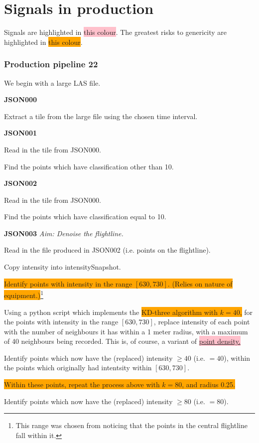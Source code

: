 \documentclass[a4paper,11pt,twoside]{article}
\theoremstyle{definition}
\theoremstyle{remark}
\newcommand{\sh}[1]{\colorbox{pink}{#1}}
\newcommand{\bad}[1]{\colorbox{orange}{#1}}
\begin{document}
\section{Signals in production}
Signals are highlighted in \sh{this colour}. The greatest risks to genericity are highlighted in \bad{this colour}.
\subsubsection{Production pipeline 22}
We begin with a large LAS file.
\begin{list}{}{}
\item \textbf{JSON000}
\item Extract a tile from the large file using the chosen time interval.
\item \textbf{JSON001}
\item Read in the tile from JSON000.
\item Find the points which have classification other than 10.
\item \textbf{JSON002}
\item Read in the tile from JSON000.
\item Find the points which have classification equal to 10.
\item \textbf{JSON003}
\emph{Aim: Denoise the flightline.}
\item Read in the file produced in JSON002 (i.e. points on the flightline).
\item Copy intensity into intensitySnapshot.
\item \bad{Identify points with intensity in the range $[630,730]$. (Relies on nature of equipment.)}\footnote{This range was chosen from noticing that the points in the central flightline fall within it.}
\item Using a python script which implements the \bad{KD-three algorithm with $k=40$,} for the points with intensity in the range $[630,730]$, replace intensity of each point with the number of neighbours it has within a 1 meter radius, with a maximum of 40 neighbours being recorded. This is, of course, a variant of \hyperref[crapptdens]{\sh{point density.}}
\item Identify points which now have the (replaced) intensity $\geqslant 40$ (i.e. $=40$), within the points which originally had intentsity within $[630,730]$.
\item \bad{Within these points, repeat the process above with $k=80$, and radius 0.25.}
\item Identify points which now have the (replaced) intensity $\geqslant 80$ (i.e. $=80$).

\end{list}
\end{document}
